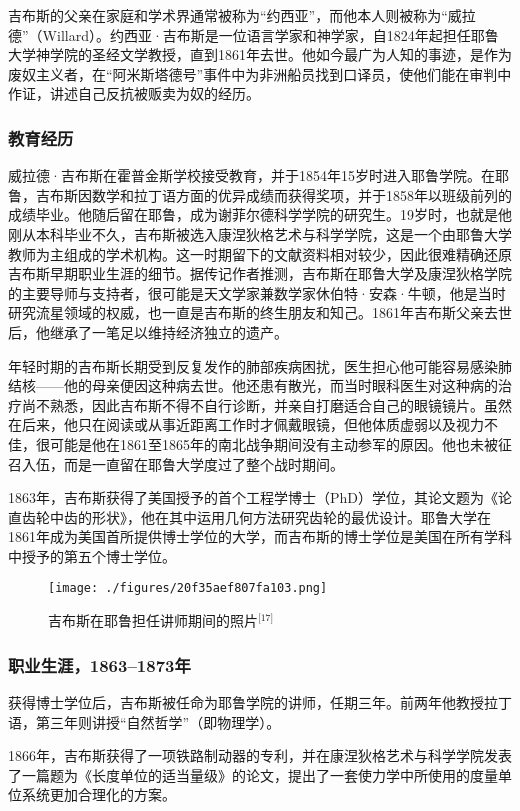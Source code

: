 吉布斯的父亲在家庭和学术界通常被称为“约西亚”，而他本人则被称为“威拉德”（Willard）。约西亚·吉布斯是一位语言学家和神学家，自1824年起担任耶鲁大学神学院的圣经文学教授，直到1861年去世。他如今最广为人知的事迹，是作为废奴主义者，在“阿米斯塔德号”事件中为非洲船员找到口译员，使他们能在审判中作证，讲述自己反抗被贩卖为奴的经历。
\subsubsection{教育经历}
威拉德·吉布斯在霍普金斯学校接受教育，并于1854年15岁时进入耶鲁学院。在耶鲁，吉布斯因数学和拉丁语方面的优异成绩而获得奖项，并于1858年以班级前列的成绩毕业。他随后留在耶鲁，成为谢菲尔德科学学院的研究生。19岁时，也就是他刚从本科毕业不久，吉布斯被选入康涅狄格艺术与科学学院，这是一个由耶鲁大学教师为主组成的学术机构。这一时期留下的文献资料相对较少，因此很难精确还原吉布斯早期职业生涯的细节。据传记作者推测，吉布斯在耶鲁大学及康涅狄格学院的主要导师与支持者，很可能是天文学家兼数学家休伯特·安森·牛顿，他是当时研究流星领域的权威，也一直是吉布斯的终生朋友和知己。1861年吉布斯父亲去世后，他继承了一笔足以维持经济独立的遗产。

年轻时期的吉布斯长期受到反复发作的肺部疾病困扰，医生担心他可能容易感染肺结核——他的母亲便因这种病去世。他还患有散光，而当时眼科医生对这种病的治疗尚不熟悉，因此吉布斯不得不自行诊断，并亲自打磨适合自己的眼镜镜片。虽然在后来，他只在阅读或从事近距离工作时才佩戴眼镜，但他体质虚弱以及视力不佳，很可能是他在1861至1865年的南北战争期间没有主动参军的原因。他也未被征召入伍，而是一直留在耶鲁大学度过了整个战时期间。

1863年，吉布斯获得了美国授予的首个工程学博士（PhD）学位，其论文题为《论直齿轮中齿的形状》，他在其中运用几何方法研究齿轮的最优设计。耶鲁大学在1861年成为美国首所提供博士学位的大学，而吉布斯的博士学位是美国在所有学科中授予的第五个博士学位。
\begin{figure}[ht]
\centering
\texttt{[image: ./figures/20f35aef807fa103.png]}
\caption{吉布斯在耶鲁担任讲师期间的照片\(^\text{[17]}\)} \label{fig_QSY_2}
\end{figure}
\subsubsection{职业生涯，1863–1873年}
获得博士学位后，吉布斯被任命为耶鲁学院的讲师，任期三年。前两年他教授拉丁语，第三年则讲授“自然哲学”（即物理学）。

1866年，吉布斯获得了一项铁路制动器的专利，并在康涅狄格艺术与科学学院发表了一篇题为《长度单位的适当量级》的论文，提出了一套使力学中所使用的度量单位系统更加合理化的方案。

